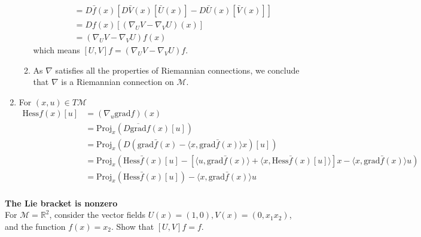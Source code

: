 \documentclass[en, oneside]{assignment}
\begin{document}
\begin{sol}
\begin{enumerate}[label=(\arabic*)]
\begin{enumerate}[label=(\alph*)]
\begin{align*}
                &= D \bar{f} (x) \left[ D \bar{V} (x) [\bar{U} (x)] - D \bar{U} (x) [\bar{V} (x)] \right]\\
                &= D f (x) \left[ (\nabla _U V - \nabla _V U) (x) \right]\\
                &= (\nabla _U V - \nabla _V U) f (x)
            \end{align*}
            which means $ [U, V] f = (\nabla _U V - \nabla _V U) f$.
            \item As $\nabla$ satisfies all the properties of Riemannian connections, we conclude that $\nabla$ is a Riemannian connection on $\mathcal{M}$.
        \end{enumerate}
        \item For $(x, u) \in T \mathcal{M}$
        \begin{align*}
            \text{Hess} f (x) [u] &= (\nabla _u \text{grad} f) (x)\\
            &= \text{Proj} _x \left( D \overline{\text{grad}} f (x) [u] \right)\\
            &= \text{Proj} _x \left( D (\text{grad} \bar{f} (x) - \langle x, \text{grad} \bar{f} (x) \rangle x) [u] \right)\\
            &= \text{Proj} _x \left( \text{Hess} \bar{f} (x) [u] - \left[ \langle u, \text{grad} \bar{f} (x) \rangle + 
            \langle x, \text{Hess} \bar{f} (x) [u] \rangle \right] x - \langle x, \text{grad} \bar{f} (x) \rangle u \right)\\
            &= \text{Proj} _x \left( \text{Hess} \bar{f} (x) [u] \right) - \langle x, \text{grad} \bar{f} (x) \rangle u\\
        \end{align*}
    \end{enumerate}
\end{sol}

\begin{prob} \textbf{The Lie bracket is nonzero} \\
    For $\mathcal{M} = \mathbb{R} ^2$, consider the vector fields $U(x) = (1, 0), V(x) = (0, x_1 x_2)$, and the function $f(x) = x_2$.
    Show that $[U, V] f = f$.
\end{prob}
\end{document}
